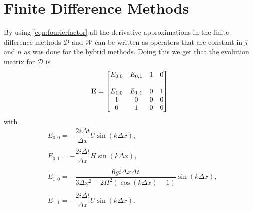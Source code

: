 \section{Finite Difference Methods}

By using \eqref{eqn:fourierfactor} all the derivative approximations in the finite difference methods $\mathcal{D}$ and $\mathcal{W}$ can be written as operators that are constant in $j$ and $n$ as was done for the hybrid methods. Doing this we get that the evolution matrix for $\mathcal{D}$ is 
\begin{equation}
\label{eqn:AppEvolD}
\mathbf{E} = \begin{bmatrix}
{E}_{0,0} & {E}_{0,1}  & 1 &0 \\ \\
{E}_{1,0} & {E}_{1,1}  & 0 &1 \\
1  & 0  &0 &0 \\
0  & 1  &0 &0 
\end{bmatrix} 
\end{equation}
with
\begin{align*}
&{E}_{0,0} = -  \dfrac{2 i\Delta t }{\Delta x} U\sin\left(k \Delta x\right) , \\ \\
&{E}_{0,1} = -  \dfrac{2 i\Delta t}{\Delta x} H \sin\left(k \Delta x\right),\\ \\
& {E}_{1,0} =-\dfrac{6 gi \Delta x\Delta t}{3 \Delta x^2 -2{H^2} \left( \cos\left(k \Delta x\right) - 1 \right)}{ \sin\left(k \Delta x\right)}, \\\\
& {E}_{1,1} =-\dfrac{2i \Delta t }{\Delta x} U \sin\left(k \Delta x\right).
\end{align*}



